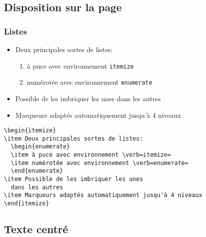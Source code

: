 \subsection{Disposition sur la page}

\begin{frame}[fragile]
  \frametitle{Listes}
  \begin{itemize}
  \item Deux principales sortes de listes:
    \begin{enumerate}
    \item \alert{à puce} avec environnement \verb=itemize=
    \item \alert{numérotée} avec environnement \verb=enumerate=
    \end{enumerate}
  \item Possible de les imbriquer les unes dans les autres
  \item Marqueurs adaptés automatiquement jusqu'à 4 niveaux
  \end{itemize}
  \pause

\begin{lstlisting}
\begin{itemize}
\item Deux principales sortes de listes:
  \begin{enumerate}
  \item à puce avec environnement \verb=itemize=
  \item numérotée avec environnement \verb=enumerate=
  \end{enumerate}
\item Possible de les imbriquer les unes
  dans les autres
\item Marqueurs adaptés automatiquement jusqu'à 4 niveaux
\end{itemize}
\end{lstlisting}
\end{frame}

\subsection{Texte centré}

